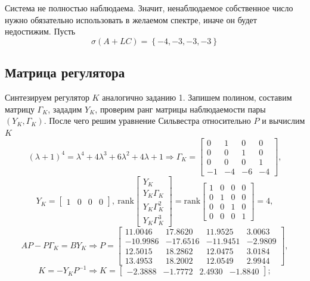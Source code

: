 \documentclass[a4paper, 12pt]{article}
\begin{document}
    Система не полностью наблюдаема.
    Значит, ненаблюдаемое собственное число нужно обязательно использовать в желаемом спектре,
    иначе он будет недостижим. Пусть
    $$
\sigma\left(A+LC\right)=\left\{-4,-3,-3,-3\right\}
    $$


    \subsection{Матрица регулятора}
    Синтезируем регулятор $K$ аналогично заданию 1. Запишем полином, составим матрицу $\Gamma_K$,
    зададим $Y_K$, проверим ранг матрицы наблюдаемости пары $\left(Y_K,\Gamma_K\right)$.
    После чего решим уравнение Сильвестра относительно $P$ и вычислим $K$
    $$
    \left(\lambda+1\right)^4=\lambda^4+4\lambda^3+6\lambda^2+4\lambda+1\Rightarrow
    \Gamma_K=\begin{bmatrix}
        0 &1 &0  &0\\
        0 &0 &1 &0\\
        0 &0 &0 &1\\
        -1 &-4 &-6 &-4
    \end{bmatrix},
    $$
    $$
    Y_K=\begin{bmatrix}
        1 &0 &0 &0
    \end{bmatrix},\ \text{rank}\begin{bmatrix}
        Y_K\\ Y_K\Gamma_K\\ Y_K\Gamma_K^2\\ Y_K\Gamma_K^3
    \end{bmatrix}=\text{rank}\begin{bmatrix}
    1     &0     &0     &0\\
    0     &1     &0     &0\\
    0     &0     &1     &0\\
    0     &0     &0     &1
    \end{bmatrix}=4,
    $$
    $$
    AP-P\Gamma_K=BY_K\Rightarrow P=\begin{bmatrix}
    11.0046   &17.8620   &11.9525    &3.0063\\
    -10.9986  &-17.6516  &-11.9451   &-2.9809\\
    12.5015   &18.2862   &12.0475    &3.0184\\
    13.4953   &18.2002   &12.0549    &2.9944
    \end{bmatrix},
    $$
    $$
    K=-Y_KP^{-1}\Rightarrow K=\begin{bmatrix}
        -2.3888   &-1.7772    &2.4930   &-1.8840
    \end{bmatrix};
    $$
\end{document}
